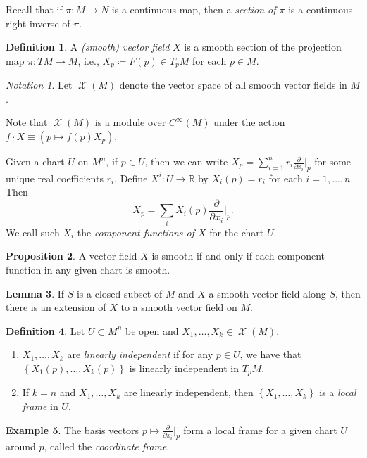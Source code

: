 \documentclass[10pt,letterpaper,cm]{nupset}
\theoremstyle{definition}
\newtheorem{definition}{Definition}[subsection]
\newtheorem{exmp}[definition]{Example}
\theoremstyle{theorem}
\newtheorem{lemma}[definition]{Lemma}
\newtheorem{prop}[definition]{Proposition}
\theoremstyle{remark}
\newtheorem*{notation}{Notation}
\newcommand{\R}{\mathbb R}
\newcommand{\1}{\mathbf{1}}
\newcommand{\0}{\vec 0}
\DeclareMathOperator{\vf}{\mathscr{X}}
\begin{document}
Recall that if $\pi : M \to N$ is a continuous map, then a \textit{section of $\pi$} is a continuous right inverse of $\pi$.


\begin{definition}
A \textit{(smooth) vector field} $X$ is a smooth section of the projection map $\pi : TM \to M$, i.e., $X_p\coloneqq  F(p) \in T_pM$ for each $p \in M$. 
\end{definition}


\begin{notation}
Let $\vf(M)$ denote the vector space of all smooth vector fields in $M$.
\end{notation}
Note that $\vf(M)$ is a module over $C^{\infty}(M)$ under the action $f \cdot X \equiv \left(p \mapsto f(p)X_p\right)$.

\medskip


Given a chart $U$ on $M^n$, if $p\in U$, then we can write $X_p = \sum_{i=1}^n r_i \frac{\partial}{\partial x_i}\bigr\rvert_p$ for some unique real coefficients $r_i$. Define $X^i : U \to \R$ by $X_i(p) = r_i$ for each $i=1, \ldots, n$. Then $$X_p = \sum_i X_i(p) \frac{\partial}{\partial x_i}\bigr\rvert_p.$$
We call such $X_i$ the \textit{component functions of $X$} for the chart $U$.


\begin{prop}
A vector field $X$ is smooth if and only if each component function in any given chart is smooth.
\end{prop}


\begin{lemma}
If $S$ is a closed subset of $M$ and $X$ a smooth vector field along $S$, then there is an extension of $X$ to a smooth vector field on $M$.
\end{lemma}

\begin{definition} Let $U \subset M^n$ be open and $X_1, \ldots, X_k \in \vf(M)$. 
\begin{enumerate}
\item  $X_1, \ldots, X_k$ are \textit{linearly independent} if for any $p\in U$, we have that $\left\{X_1(p), \ldots, X_k(p)\right\}$ is linearly independent in $T_pM$.
\item If $k=n$ and $X_1, \ldots, X_k$ are linearly independent, then $\left\{X_1, \ldots, X_k\right\}$ is a \textit{local frame} in $U$.
\end{enumerate}
\end{definition}

\begin{exmp}
The basis vectors $p\mapsto \frac{\partial}{\partial{x_i}}\bigr\rvert_p$ form a local frame for a given chart $U$ around $p$, called the \textit{coordinate frame}.
\end{exmp}
\end{document}
